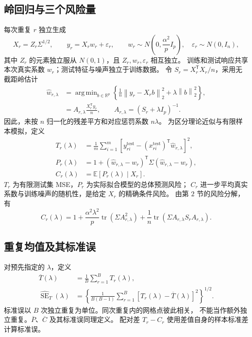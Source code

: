 \documentclass[UTF8,fontset=fandol,a4paper,zihao=-4]{ctexart}
\DeclareMathOperator{\tr}{tr}
\DeclareMathOperator{\SE}{SE}
\DeclareMathOperator*{\argmin}{arg\,min}
\newcommand{\E}{\mathbb E}
\newcommand{\norm}[1]{\left\lVert #1\right\rVert}
\newcommand{\Tbar}{\overline T}
\newcommand{\Pbar}{\overline P}
\newcommand{\Cbar}{\overline C}
\numberwithin{equation}{section}
\begin{document}
\subsection{岭回归与三个风险量}
每次重复 $r$ 独立生成
\begin{equation}\label{eq:model}
 X_r=Z_r\Sigma^{1/2},\qquad y_r=X_rw_r+\varepsilon_r,\qquad
 w_r\sim N\!\left(0,\frac{\alpha^2}{p}I_p\right),
 \quad\varepsilon_r\sim N(0,I_n),
\end{equation}
其中 $Z_r$ 的元素独立服从 $N(0,1)$，且 $Z_r,w_r,\varepsilon_r$ 相互独立。
训练和测试响应共享本次真实系数 $w_r$；测试特征与噪声独立于训练数据。
令 $S_r=X_r^{\mathsf T}X_r/n$，采用无截距岭估计
\begin{align}
 \widehat w_{r,\lambda}
 &=\argmin_{b\in\mathbb R^p}
 \left\{\frac{1}{n}\norm{y_r-X_rb}_2^2+\lambda\norm b_2^2\right\},\label{eq:objective}\\
 &=A_{r,\lambda}\frac{X_r^{\mathsf T}y_r}{n},\qquad
 A_{r,\lambda}=(S_r+\lambda I_p)^{-1}.\label{eq:fit}
\end{align}
因此，未按 $n$ 归一化的残差平方和对应惩罚系数 $n\lambda$。
为区分理论近似与有限样本模拟，定义
\begin{align}
 T_r(\lambda)
 &=\frac{1}{m}\sum_{i=1}^m
 \left[y_{ri}^{\mathrm{test}}-(x_{ri}^{\mathrm{test}})^{\mathsf T}
 \widehat w_{r,\lambda}\right]^2,\label{eq:test}\\
 P_r(\lambda)
 &=1+(\widehat w_{r,\lambda}-w_r)^{\mathsf T}
 \Sigma(\widehat w_{r,\lambda}-w_r),\label{eq:population}\\
 C_r(\lambda)&=\E\!\left[P_r(\lambda)\mid X_r\right].\label{eq:condition}
\end{align}
$T_r$ 为有限测试集 MSE，$P_r$ 为实际拟合模型的总体预测风险；
$C_r$ 进一步平均真实系数与训练噪声的随机性，是给定 $X_r$ 的精确条件风险。
由\cite{dw}第 $2$ 节的风险分解，有
\begin{equation}\label{eq:exact}
 C_r(\lambda)=1+\frac{\alpha^2\lambda^2}{p}\tr(\Sigma A_{r,\lambda}^2)
 +\frac{1}{n}\tr(\Sigma A_{r,\lambda}S_rA_{r,\lambda}).
\end{equation}

\subsection{重复均值及其标准误}
对预先指定的 $\lambda$，定义
\begin{align}
 \Tbar(\lambda)&=\frac1B\sum_{r=1}^B T_r(\lambda),\label{eq:mean}\\
 \widehat{\SE}_T(\lambda)
 &=\left\{\frac{1}{B(B-1)}\sum_{r=1}^B
 [T_r(\lambda)-\Tbar(\lambda)]^2\right\}^{1/2}.\label{eq:se}
\end{align}
标准误以 $B$ 次独立重复为单位。同次重复内的网格点彼此相关，
不能当作额外独立重复。$\Pbar$、$\Cbar$ 及其标准误同理定义。
配对差 $T_r-C_r$ 使用差值自身的样本标准差计算标准误。
\end{document}
